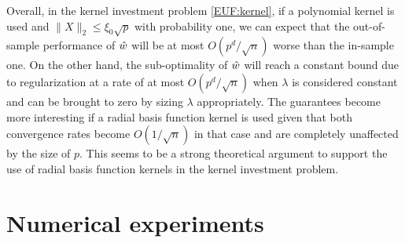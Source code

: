 \documentclass[]{interact}
\theoremstyle{plain}%
\theoremstyle{definition}
\theoremstyle{remark}
\newcommand{\0}{\V{0}}
\newcommand{\1}{\V{1}}
\newcommand{\modified}[1]{{\color{blue} #1}}
\theoremstyle{plain}
\theoremstyle{definition}
\begin{document}
Overall, in the kernel investment problem \eqref{EUF:kernel}, if a polynomial kernel is used and $\|X\|_2\leq \xi_0\sqrt{p}$ with probability one, we can expect that the out-of-sample   performance of ${\hat{w}}$ will be at most $O(p^d/\sqrt{n})$ worse than the in-sample one. On the other hand, the sub-optimality of ${\hat{w}}$ will reach a constant bound due to regularization at a rate of at most $O(p^d/\sqrt{n})$ when $\lambda$ is considered constant and can be brought to zero by sizing $\lambda$ appropriately.  The guarantees become more interesting if a radial basis function kernel is used given that both convergence rates become $O(1/\sqrt{n})$ in that case and are completely unaffected by the size of $p$. This seems to be a strong theoretical argument to support the use of radial basis function kernels in the kernel investment problem.


%

% 
\section{\modified{Numerical experiments}}\label{sec:num}
\newcommand{\fixedP}{{\textit{fixed policy}}}
\newcommand{\adaptPstd}{\textit{$\sigma$-adapted policy without clipping} }
\newcommand{\adaptPclipped}{\textit{$\sigma$-adapted policy with clipping} }
\end{document}
